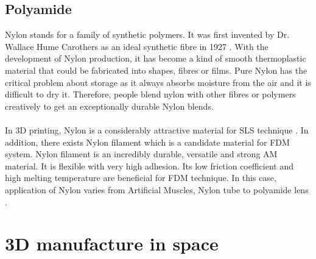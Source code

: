 \subsection{Polyamide}

Nylon stands for a family of synthetic polymers. It was first invented by Dr. Wallace Hume Carothers as an ideal synthetic fibre in 1927 \cite{doi:10.1021/ed021p88}. With the development of Nylon production, it has become a kind of smooth thermoplastic material that could be fabricated into shapes, fibres or films. Pure Nylon has the critical problem about storage as it always absorbs moisture from the air and it is difficult to dry it. Therefore, people blend nylon with other fibres or polymers creatively to get an exceptionally durable Nylon blends.\\
\\
 In 3D printing, Nylon is a considerably attractive material for SLS technique \cite{shaw2016investigation}. In addition, there exists Nylon filament which is a candidate material for FDM system. Nylon filament is an incredibly durable, versatile and strong AM material. It is flexible with very high adhesion. Its low friction coefficient and high melting temperature are beneficial for FDM technique. In this case, application of Nylon varies from Artificial Muscles\cite{arjun2016design}, Nylon tube \cite{webb2006integration} to polyamide lens \cite{bunea2014investigation}.
 
\section{3D manufacture in space}

